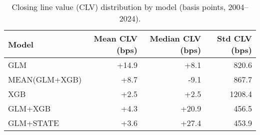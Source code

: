 \begin{table}[t]
  \centering
  \small
  \caption[CLV distribution by model]{Closing line value (CLV) distribution by model (basis points, 2004--2024).}
  \label{tab:clv-distribution}
  \setlength{\tabcolsep}{4pt}\renewcommand{\arraystretch}{1.12}
  \begin{tabular}{@{} l r r r @{} }
    \toprule
    \textbf{Model}  & \textbf{Mean CLV (bps)}  & \textbf{Median CLV (bps)}  & \textbf{Std CLV (bps)} \\
    \midrule
    GLM & +14.9 & +8.1 & 820.6 \\
    MEAN(GLM+XGB) & +8.7 & -9.1 & 867.7 \\
    XGB & +2.5 & +2.5 & 1208.4 \\
    GLM+XGB & +4.3 & +20.9 & 456.5 \\
    GLM+STATE & +3.6 & +27.4 & 453.9 \\
    \bottomrule
  \end{tabular}
\end{table}
